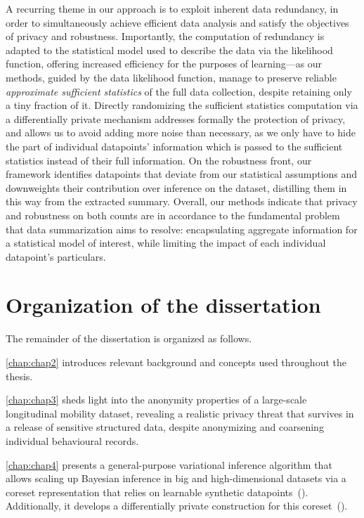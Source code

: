 A recurring theme in our approach is to exploit inherent data redundancy, in order to simultaneously achieve efficient data analysis and satisfy the objectives of privacy and robustness. Importantly, the computation of redundancy is adapted to the statistical model used to describe the data via the likelihood function, offering increased efficiency for the purposes of learning---as our methods, guided by the data likelihood function, manage to preserve reliable \emph{approximate sufficient statistics} of the full data collection, despite retaining only a tiny fraction of it. Directly randomizing the sufficient statistics computation via a differentially private mechanism addresses formally the protection of privacy, and allows us to avoid adding more noise than necessary, as we only have to hide the part of individual datapoints' information which is passed to the sufficient statistics instead of their full information. On the robustness front, our framework identifies datapoints that deviate from our statistical assumptions and downweights their contribution over inference on the dataset, distilling them in this way from the extracted summary. Overall, our methods indicate that privacy and robustness on both counts are in accordance to the fundamental problem that data summarization aims to resolve: encapsulating aggregate information for a statistical model of interest, while limiting the impact of each individual datapoint's particulars.


\section{Organization of the dissertation}
\label{sec:thesis-organization}
The remainder of the dissertation is organized as follows. 

\cref{chap:chap2} introduces relevant background and concepts used throughout the thesis. 

\cref{chap:chap3} sheds light into the anonymity properties of a large-scale longitudinal mobility dataset, revealing a realistic privacy threat that survives in a release of sensitive structured data, despite anonymizing and coarsening individual behavioural records. 

\cref{chap:chap4} presents a general-purpose variational inference algorithm that allows scaling up Bayesian inference in big and high-dimensional datasets via a coreset representation that relies on learnable synthetic datapoints~(\psvi). Additionally, it develops a differentially private construction for this coreset~(\dpsvi). 

